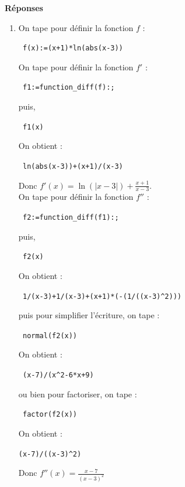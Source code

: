 \documentclass{article}
\begin{document}
{\bf R\'eponses}
\begin{enumerate}
\item 
On tape pour d\'efinir la fonction $f$ :
\begin{center}
\verb| f(x):=(x+1)*ln(abs(x-3))|
\end{center}
On tape pour d\'efinir la fonction $f'$ :
\begin{center}
\verb| f1:=function_diff(f):;|
\end{center}
puis,
\begin{center}
\verb| f1(x)|
\end{center}
On obtient :
\begin{center}
\verb| ln(abs(x-3))+(x+1)/(x-3)|
\end{center}
Donc $\displaystyle f'(x)=\ln(|x-3|)+\frac{x+1}{x-3}$.\\
On tape  pour d\'efinir la fonction $f''$ :
\begin{center}
\verb| f2:=function_diff(f1):;|
\end{center}
puis,
\begin{center}
\verb| f2(x)|
\end{center}
On obtient :
\begin{center}
\verb| 1/(x-3)+1/(x-3)+(x+1)*(-(1/((x-3)^2)))|
\end{center}
puis pour simplifier l'\'ecriture, on tape :
\begin{center}
\verb| normal(f2(x))|
\end{center}
On obtient :
\begin{center}
\verb| (x-7)/(x^2-6*x+9)|
\end{center}
ou bien pour factoriser, on tape : 
\begin{center}
\verb| factor(f2(x))|
\end{center}
On obtient :
\begin{center}
\verb|(x-7)/((x-3)^2)|
\end{center}
Donc $\displaystyle f''(x)= \frac{x-7}{(x-3)^2}$


\end{enumerate}
\end{document}
